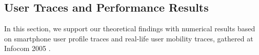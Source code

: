 \documentclass[12pt,epsf]{article}
\theoremstyle{definition}
\begin{document}
\vspace{-0.5 cm}
\subsection{User Traces and Performance Results}
\vspace{-0.2 cm}
In this section, we support our theoretical findings with numerical results based on 
smartphone user profile traces \cite{data} and real-life user mobility traces, gathered at Infocom 2005 \cite{infocom,diot}.
\vspace{-0.3 cm}
\end{document}
